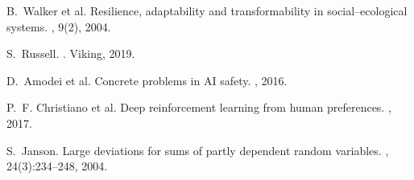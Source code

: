 \documentclass[11pt,a4paper]{article}
\begin{document}
\begin{thebibliography}{10}
B.~Walker et al.
\newblock Resilience, adaptability and transformability in social--ecological systems.
, 9(2), 2004.

S.~Russell.
.
\newblock Viking, 2019.

D.~Amodei et al.
\newblock Concrete problems in AI safety.
, 2016.

P.~F. Christiano et al.
\newblock Deep reinforcement learning from human preferences.
, 2017.

S.~Janson.
\newblock Large deviations for sums of partly dependent random variables.
, 24(3):234--248, 2004.

\end{thebibliography}
\end{document}

